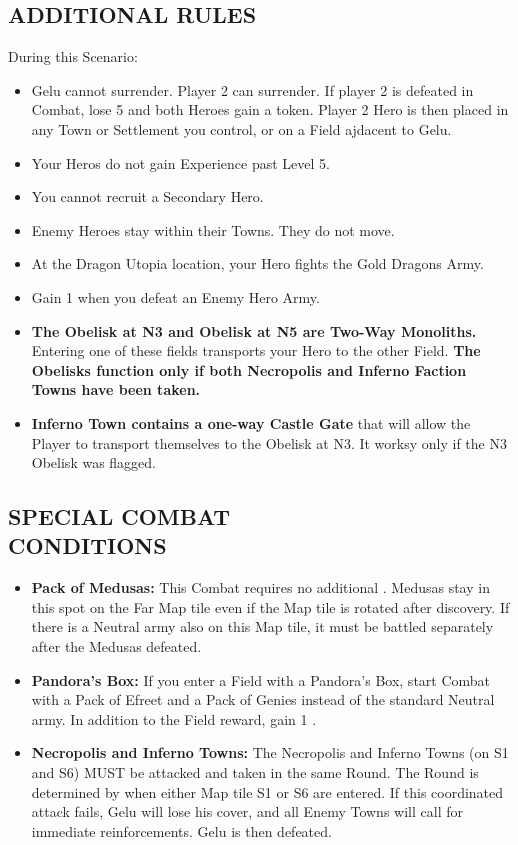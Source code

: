 \begin{multicols*}{2}
\subsection*{\MakeUppercase{Additional Rules}}

During this Scenario:

\begin{itemize}
    \item Gelu cannot surrender.
      Player 2 can surrender.
      If player 2 is defeated in Combat, lose 5  and both Heroes gain a  token.
      Player 2 Hero is then placed in any Town or Settlement you control, or on a Field ajdacent to Gelu.
    \item Your Heros do not gain Experience past Level 5.
    \item You cannot recruit a Secondary Hero.
    \item Enemy Heroes stay within their Towns. They do not move.
    \item At the Dragon Utopia location, your Hero fights the Gold Dragons Army.
    \item Gain 1  when you defeat an Enemy Hero Army.
    \item \textbf{The Obelisk at N3 and Obelisk at N5 are Two-Way Monoliths.}
      Entering one of these fields transports your Hero to the other Field. \textbf{The Obelisks function only if both Necropolis and Inferno Faction Towns have been taken.}
    \item \textbf{Inferno Town contains a one-way Castle Gate} that will allow the Player to transport themselves to the Obelisk at N3. It worksy only if the N3 Obelisk was flagged.
\end{itemize}

\subsection*{\MakeUppercase{Special Combat\\Conditions}}

\begin{itemize}
  \item \textbf{Pack of Medusas:} This Combat requires no additional .
    Medusas stay in this spot on the Far Map tile even if the Map tile is rotated after discovery.
    If there is a Neutral army also on this Map tile, it must be battled separately after the Medusas defeated.
  \item \textbf{Pandora’s Box:} If you enter a Field with a Pandora’s Box, start Combat with a Pack of Efreet and a Pack of Genies instead of the standard Neutral army.
    In addition to the Field reward, gain 1 .
  \item \textbf{Necropolis and Inferno Towns:} The Necropolis and Inferno Towns (on S1 and S6) MUST be attacked and taken in the same Round.
    The Round is determined by when either Map tile S1 or S6 are entered.
    If this coordinated attack fails, Gelu will lose his cover, and all Enemy Towns will call for immediate reinforcements.
    Gelu is then defeated.
\end{itemize}


\end{multicols*}
